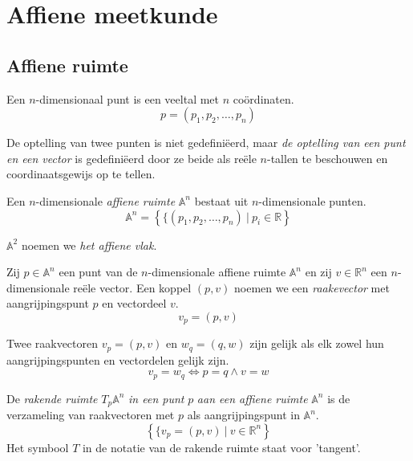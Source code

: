 \documentclass[main.tex]{subfiles}
\begin{document}
\chapter{Affiene meetkunde}
\label{cha:affiene-meetkunde}

\section{Affiene ruimte}
\label{sec:affiene-ruimte}

\begin{de}
  Een $n$-dimensionaal punt is een veeltal met $n$ co\"ordinaten.
  \[ p = (p_{1}, p_{2}, \ldots, p_{n}) \]
\end{de}

\begin{de}
  De optelling van twee punten is niet gedefini\"eerd, maar \emph{de optelling van een punt en een vector} is gedefini\"eerd door ze beide als re\"ele $n$-tallen te beschouwen en coordinaatsgewijs op te tellen.
\end{de}

\begin{de}
  Een $n$-dimensionale \emph{affiene ruimte} $\mathbb{A}^{n}$ bestaat uit $n$-dimensionale punten.
  \[ \mathbb{A}^{n} = \left\{\{ (p_{1}, p_{2}, \ldots, p_{n}) \ |\ p_{i} \in \mathbb{R} \right\} \]
\end{de}

\begin{de}
  $\mathbb{A}^{2}$ noemen we \emph{het affiene vlak}.
\end{de}

\begin{de}
  Zij $p \in \mathbb{A}^{n}$ een punt van de $n$-dimensionale affiene ruimte $\mathbb{A}^{n}$ en zij $v \in \mathbb{R}^{n}$ een $n$-dimensionale re\"ele vector.
  Een koppel $(p,v)$ noemen we een \emph{raakevector} met aangrijpingspunt $p$ en vectordeel $v$.
  \[ v_{p} = (p,v) \]
\end{de}

\begin{de}
  Twee raakvectoren $v_{p} = (p,v)$ en $w_{q} = (q,w)$ zijn gelijk als elk zowel hun aangrijpingspunten en vectordelen gelijk zijn.
  \[ v_{p} = w_{q} \Leftrightarrow p = q \wedge v = w \]
\end{de}

\begin{de}
  De \emph{rakende ruimte} $T_{p}\mathbb{A}^{n}$ \emph{in een punt} $p$ \emph{aan een affiene ruimte} $\mathbb{A}^{n}$ is de verzameling van raakvectoren met $p$ als aangrijpingspunt in $\mathbb{A}^{n}$.
  \[ \left\{\{v_{p} = (p,v)\ |\ v \in \mathbb{R}^{n} \right\} \]
  Het symbool $T$ in de notatie van de rakende ruimte staat voor 'tangent'.
\end{de}
\end{document}
